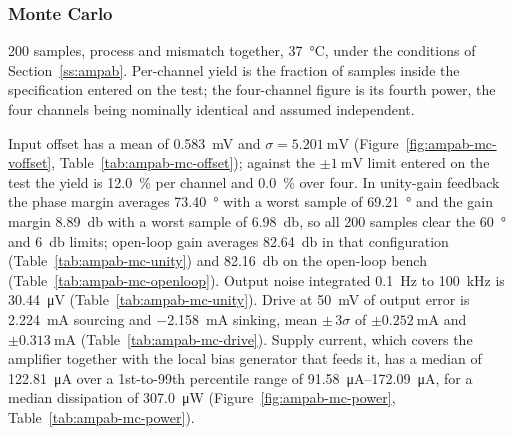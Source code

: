 %
%
%

\subsubsection{Monte Carlo}\label{sss:ampab-mc}

200 samples, process and mismatch together, \SI{37}{\celsius}, under the conditions of
Section~\ref{ss:ampab}. Per-channel yield is the fraction of samples inside the
specification entered on the test; the four-channel figure is its fourth power, the four
channels being nominally identical and assumed independent.

Input offset has a mean of \SI{0.583}{\milli\volt} and \(\sigma =
\SI{5.201}{\milli\volt}\) (Figure~\ref{fig:ampab-mc-voffset},
Table~\ref{tab:ampab-mc-offset}); against the \(\pm\SI{1}{\milli\volt}\) limit entered
on the test the yield is \SI{12.0}{\percent} per channel and \SI{0.0}{\percent} over
four. In unity-gain feedback the phase margin averages \SI{73.40}{\degree} with a worst
sample of \SI{69.21}{\degree} and the gain margin \SI{8.89}{\decibel} with a worst
sample of \SI{6.98}{\decibel}, so all 200 samples clear the \SI{60}{\degree} and
\SI{6}{\decibel} limits; open-loop gain averages \SI{82.64}{\decibel} in that
configuration (Table~\ref{tab:ampab-mc-unity}) and \SI{82.16}{\decibel} on the open-loop
bench (Table~\ref{tab:ampab-mc-openloop}). Output noise integrated \SI{0.1}{\hertz} to
\SI{100}{\kilo\hertz} is \SI{30.44}{\micro\volt} (Table~\ref{tab:ampab-mc-unity}). Drive
at \SI{50}{\milli\volt} of output error is \SI{2.224}{\milli\ampere} sourcing and
\SI{-2.158}{\milli\ampere} sinking, mean \(\pm\,3\sigma\) of
\(\pm\SI{0.252}{\milli\ampere}\) and \(\pm\SI{0.313}{\milli\ampere}\)
(Table~\ref{tab:ampab-mc-drive}). Supply current, which covers the amplifier together
with the local bias generator that feeds it, has a median of \SI{122.81}{\micro\ampere}
over a 1st-to-99th percentile range of \SIrange{91.58}{172.09}{\micro\ampere}, for a
median dissipation of \SI{307.0}{\micro\watt} (Figure~\ref{fig:ampab-mc-power},
Table~\ref{tab:ampab-mc-power}).
